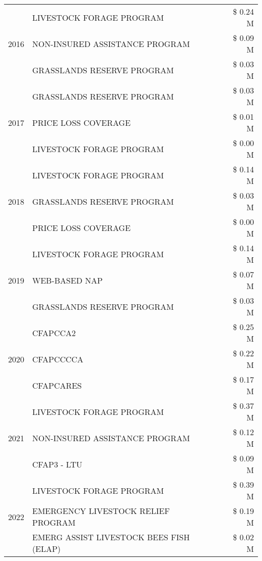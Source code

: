 \begin{tabular}{llr}
\cline{1-3}
\multirow[t]{3}{*}{2016} & LIVESTOCK FORAGE PROGRAM & \$ 0.24 M \\
 & NON-INSURED ASSISTANCE PROGRAM & \$ 0.09 M \\
 & GRASSLANDS RESERVE PROGRAM & \$ 0.03 M \\
\cline{1-3}
\multirow[t]{3}{*}{2017} & GRASSLANDS RESERVE PROGRAM & \$ 0.03 M \\
 & PRICE LOSS COVERAGE & \$ 0.01 M \\
 & LIVESTOCK FORAGE PROGRAM & \$ 0.00 M \\
\cline{1-3}
\multirow[t]{3}{*}{2018} & LIVESTOCK FORAGE PROGRAM & \$ 0.14 M \\
 & GRASSLANDS RESERVE PROGRAM & \$ 0.03 M \\
 & PRICE LOSS COVERAGE & \$ 0.00 M \\
\cline{1-3}
\multirow[t]{3}{*}{2019} & LIVESTOCK FORAGE PROGRAM & \$ 0.14 M \\
 & WEB-BASED NAP & \$ 0.07 M \\
 & GRASSLANDS RESERVE PROGRAM & \$ 0.03 M \\
\cline{1-3}
\multirow[t]{3}{*}{2020} & CFAPCCA2 & \$ 0.25 M \\
 & CFAPCCCCA & \$ 0.22 M \\
 & CFAPCARES & \$ 0.17 M \\
\cline{1-3}
\multirow[t]{3}{*}{2021} & LIVESTOCK FORAGE PROGRAM & \$ 0.37 M \\
 & NON-INSURED ASSISTANCE PROGRAM & \$ 0.12 M \\
 & CFAP3 - LTU & \$ 0.09 M \\
\cline{1-3}
\multirow[t]{3}{*}{2022} & LIVESTOCK FORAGE PROGRAM & \$ 0.39 M \\
 & EMERGENCY LIVESTOCK RELIEF PROGRAM & \$ 0.19 M \\
 & EMERG ASSIST LIVESTOCK BEES FISH (ELAP) & \$ 0.02 M \\
\cline{1-3}
\bottomrule
\end{tabular}
